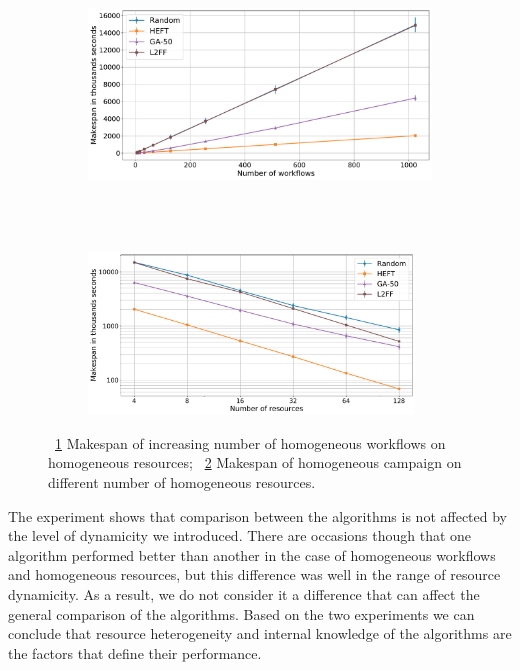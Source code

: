 \begin{figure}[ht!]
    \centering
    \begin{subfigure}[b]{0.85\textwidth}
        \includegraphics[width=.95\textwidth]{figures/campaign/StHeteroCampaigns_4DynHeteroResources.pdf}
        \caption{}
        \label{fig:StHeteroCampaigns_4DyHeteroResources}
    \end{subfigure}\\
    ~ 
    \begin{subfigure}[b]{0.85\textwidth}
        \includegraphics[width=0.95\textwidth]{figures/campaign/DynHeteroResources_StHeteroCampaigns.pdf}
        \caption{}
        \label{fig:DyHeteroResources_StHeteroCampaigns}
    \end{subfigure}
    \caption{~\ref{fig:StHeteroCampaigns_4DyHeteroResources} Makespan of increasing number of homogeneous workflows on homogeneous resources;
    ~\ref{fig:DyHeteroResources_StHeteroCampaigns} Makespan of homogeneous campaign on different number of homogeneous resources.}
    \label{fig:dyn_hetero_analysis}
\end{figure}

The experiment shows that comparison between the algorithms is not affected by the level of dynamicity we introduced.
There are occasions though that one algorithm performed better than another in the case of homogeneous workflows and homogeneous resources, but this difference was well in the range of resource dynamicity.
As a result, we do not consider it a difference that can affect the general comparison of the algorithms.
Based on the two experiments we can conclude that resource heterogeneity and internal knowledge of the algorithms are the factors that define their performance.





